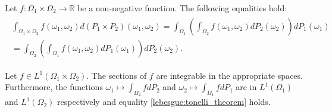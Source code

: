     \begin{theorem}[Tonelli]
        Let $f:\Omega_1\times\Omega_2\rightarrow\mathbb{R}$ be a non-negative function. The following equalities hold:
        \begin{gather}
            \label{lebesgue:tonelli_theorem}
            \begin{split}
                \int_{\Omega_1\times\Omega_2}f(\omega_1,\omega_2)d(P_1\times P_2)(\omega_1,\omega_2) = \int_{\Omega_1}\left(\int_{\Omega_2}f(\omega_1,\omega_2)dP_2(\omega_2)\right)dP_1(\omega_1)\\ = \int_{\Omega_2}\left(\int_{\Omega_1}f(\omega_1,\omega_2)dP_1(\omega_1)\right)dP_2(\omega_2).
            \end{split}
        \end{gather}
    \end{theorem}

    \begin{result}[Fubini]
        Let $f\in L^1(\Omega_1\times\Omega_2)$. The sections of $f$ are integrable in the appropriate spaces. Furthermore, the functions $\omega_1\mapsto\int_{\Omega_2} fdP_2$ and $\omega_2\mapsto\int_{\Omega_1}fdP_1$ are in $L^1(\Omega_1)$ and $L^1(\Omega_2)$ respectively and equality \ref{lebesgue:tonelli_theorem} holds.
    \end{result}
